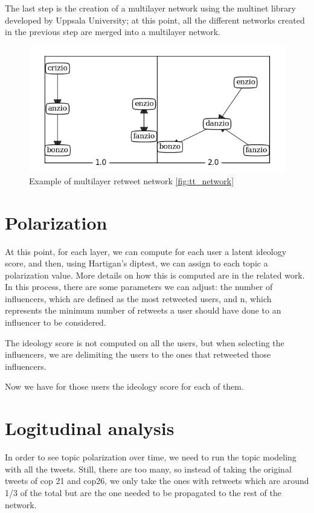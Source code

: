 The last step is the creation of a multilayer network using the multinet library developed by Uppsala University; at this point, all the different networks created in the previous step are merged into a multilayer network.

\begin{figure}
    \centering
    \includegraphics[width=0.75\linewidth]{Chapter4/figures/projected_topics_ml.png}
    \caption{Example of multilayer retweet network \ref{fig:tt_network}}
    \label{fig:multilayer}
\end{figure}




\section{Polarization}
At this point, for each layer, we can compute for each user a latent ideology score, and then, using Hartigan's diptest, we can assign to each topic a polarization value. More details on how this is computed are in the related work.
In this process, there are some parameters we can adjust: the number of influencers, which are defined as the most retweeted users, and n, which represents the minimum number of retweets a user should have done to an influencer to be considered.

The ideology score is not computed on all the users, but when selecting the influencers, we are delimiting the users to the ones that retweeted those influencers. 

Now we have for those users the ideology score for each of them.



\section{Logitudinal analysis}
In order to see topic polarization over time, we need to run the topic modeling with all the tweets. Still, there are too many, so instead of taking the original tweets of cop 21 and cop26, we only take the ones with retweets which are around 1/3 of the total but are the one needed to be propagated to the rest of the network.

